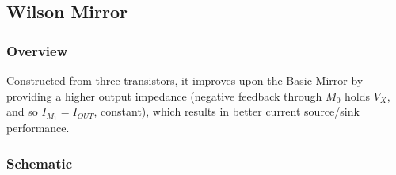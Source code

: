 \subsection{Wilson Mirror}

\subsubsection{Overview}
Constructed from three transistors, it improves
upon the Basic Mirror by providing a higher output
impedance (negative feedback through \(M_0\) holds
\(V_X\), and so \(I_{M_1} = I_{OUT}\), constant), which
results in better current source/sink performance.

\subsubsection{Schematic}
